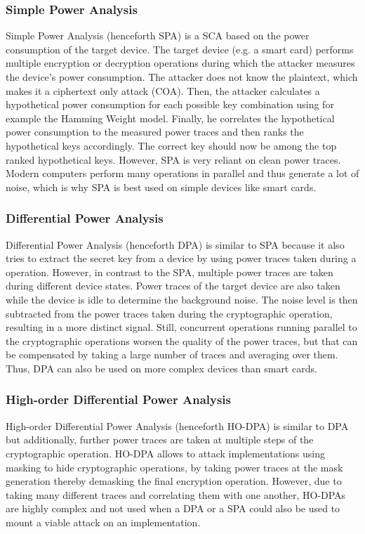 \documentclass[journal]{IEEEtran}
\begin{document}
\subsubsection{Simple Power Analysis}
Simple Power Analysis (henceforth SPA) is a SCA based on the power consumption of the target device. The target device (e.g. a smart card) performs multiple encryption or decryption operations during which the attacker measures the device's power consumption. The attacker does not know the plaintext, which makes it a ciphertext only attack (COA). Then, the attacker calculates a hypothetical power consumption for each possible key combination using for example the Hamming Weight model. Finally, he correlates the hypothetical power consumption to the measured power traces and then ranks the hypothetical keys accordingly. The correct key should now be among the top ranked hypothetical keys. However, SPA is very reliant on clean power traces. Modern computers perform many operations in parallel and thus generate a lot of noise, which is why SPA is best used on simple devices like smart cards. 

\subsubsection{Differential Power Analysis}
Differential Power Analysis (henceforth DPA) is similar to SPA because it also tries to extract the secret key from a device by using power traces taken during a operation. However, in contrast to the SPA, multiple power traces are taken during different device states. Power traces of the target device are also taken while the device is idle to determine the background noise. The noise level is then subtracted from the power traces taken during the cryptographic operation, resulting in a more distinct signal. Still, concurrent operations running parallel to the cryptographic operations worsen the quality of the power traces, but that can be compensated by taking a large number of traces and averaging over them. Thus, DPA can also be used on more complex devices than smart cards.

\subsubsection{High-order Differential Power Analysis}
High-order Differential Power Analysis (henceforth HO-DPA) is similar to DPA but additionally, further power traces are taken at multiple steps of the cryptographic operation. HO-DPA allows to attack implementations using masking to hide cryptographic operations, by taking power traces at the mask generation thereby demasking the final encryption operation. However, due to taking many different traces and correlating them with one another, HO-DPAs are highly complex and not used when a DPA or a SPA could also be used to mount a viable attack on an implementation.
\end{document}

